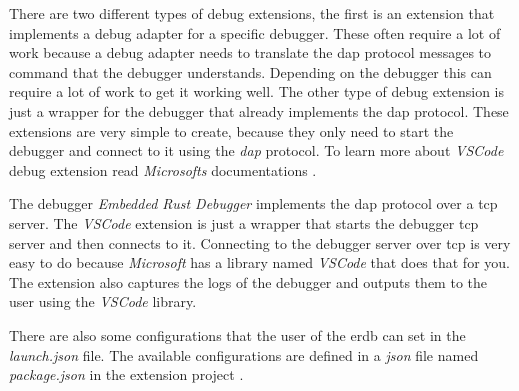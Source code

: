 There are two different types of debug extensions, the first is an extension that implements a debug adapter for a specific debugger.
These often require a lot of work because a debug adapter needs to translate the \gls{dap} protocol messages to command that the debugger understands.
Depending on the debugger this can require a lot of work to get it working well.
The other type of debug extension is just a wrapper for the debugger that already implements the \gls{dap} protocol.
These extensions are very simple to create, because they only need to start the debugger and connect to it using the \emph{dap} protocol.
To learn more about \emph{VSCode} debug extension read \emph{Microsofts} documentations \cite{vscode-debugger-extension-doc}.


The debugger \emph{Embedded Rust Debugger} implements the \gls{dap} protocol over a \gls{tcp} server.
The \emph{VSCode} extension is just a wrapper that starts the debugger \gls{tcp} server and then connects to it.
Connecting to the debugger server over \gls{tcp} is very easy to do because \emph{Microsoft} has a library named \emph{VSCode} that does that for you.
The extension also captures the logs of the debugger and outputs them to the user using the \emph{VSCode} library.


There are also some configurations that the user of the \gls{erdb} can set in the \emph{launch.json} file.
The available configurations are defined in a \emph{json} file named \emph{package.json} in the extension project \cite{erdb-vscode}.
